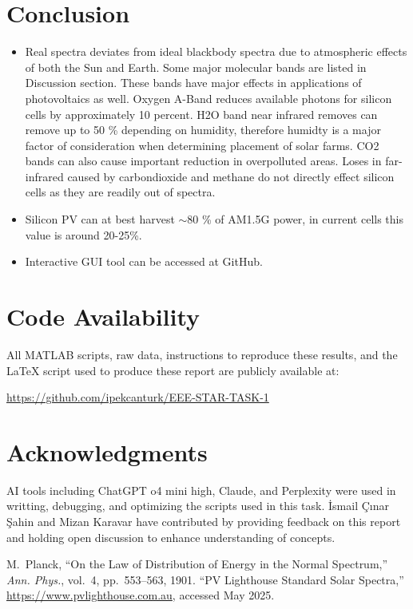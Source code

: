 \documentclass[11pt,a4paper]{article}
\begin{document}
\section{Conclusion}
\begin{itemize}
  \item Real spectra deviates from ideal blackbody spectra due to atmospheric effects of both the Sun and Earth. Some major molecular bands are listed in Discussion section. These bands have major effects in applications of photovoltaics as well. Oxygen A-Band reduces available photons for silicon cells by approximately 10 percent. H2O band near infrared removes can remove up to 50 \% depending on humidity, therefore humidty is a major factor of consideration when determining placement of solar farms. CO2 bands can also cause important reduction in overpolluted areas. Loses in far-infrared caused by carbondioxide and methane do not directly effect silicon cells as they are readily out of spectra. 
  \item Silicon PV can at best harvest \(\sim\)80 \% of AM1.5G power, in current cells this value is around 20-25\%.  
  \item Interactive GUI tool can be accessed at GitHub.
\end{itemize}

\section*{Code Availability}
All MATLAB scripts, raw data, instructions to reproduce these results, and the LaTeX script used to produce these report are publicly available at:  
\begin{center}
  \url{https://github.com/ipekcanturk/EEE-STAR-TASK-1}
\end{center}

\section*{Acknowledgments}
AI tools including ChatGPT o4 mini high, Claude, and Perplexity were used in writting, debugging, and optimizing the scripts used in this task.
İsmail Çınar Şahin and Mizan Karavar have contributed by providing feedback on this report and holding open discussion to enhance understanding of concepts.

\begin{thebibliography}{9}
M.~Planck, “On the Law of Distribution of Energy in the Normal Spectrum,” \emph{Ann. Phys.}, vol.\ 4, pp.\ 553–563, 1901.
“PV Lighthouse Standard Solar Spectra,” \url{https://www.pvlighthouse.com.au}, accessed May 2025.
\end{thebibliography}
\end{document}
